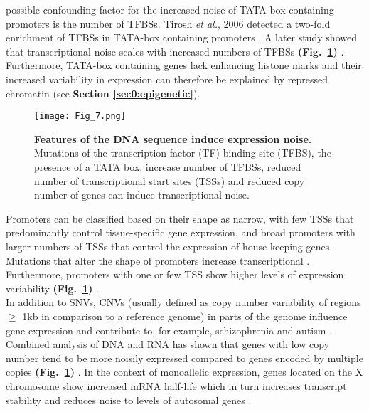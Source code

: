  possible confounding factor for the increased noise of TATA-box containing promoters is the number of TFBSs. 
Tirosh \textit{et al.}, 2006 detected a two-fold enrichment of TFBSs in TATA-box containing promoters \citep{Tirosh2006}. 
A later study showed that transcriptional noise scales with increased numbers of TFBSs \textbf{(Fig.~\ref{fig0:DNA_features})} \citep{Sharon2014}. 
Furthermore, TATA-box containing genes lack enhancing histone marks and their increased variability in expression can therefore be explained by repressed chromatin \citep{Choi2008} (see \textbf{Section \ref{sec0:epigenetic}}).  

\begin{figure}[!h]
\centering
\texttt{[image: Fig\_7.png]}
\caption[Features of the DNA sequence induce expression noise]{\textbf{Features of the DNA sequence induce expression noise.}\\
Mutations of the transcription factor (TF) binding site (TFBS), the presence of a TATA box, increase number of TFBSs, reduced number of transcriptional start sites (TSSs) and reduced copy number of genes can induce transcriptional noise.}
\label{fig0:DNA_features}
\end{figure}

Promoters can be classified based on their shape as narrow, with few \glspl{TSS} that predominantly control tissue-specific gene expression, and broad promoters with larger numbers of TSSs that control the expression of house keeping genes. 
Mutations that alter the shape of promoters increase transcriptional  \citep{Schor2017a}. 
Furthermore, promoters with one or few TSS show higher levels of expression variability \textbf{(Fig.~\ref{fig0:DNA_features})} \citep{Faure2017}.\\

In addition to \glspl{SNV}, \glspl{CNV} (usually defined as copy number variability of regions $\geq$ 1kb in comparison to a reference genome) in parts of the genome influence gene expression and contribute to, for example, schizophrenia and autism \citep{Gamazon2015}. 
Combined analysis of DNA and RNA has shown that genes with low copy number tend to be more noisily expressed compared to genes encoded by multiple copies \textbf{(Fig.~\ref{fig0:DNA_features})} \citep{Dey2015}. 
In the context of monoallelic expression, genes located on the X chromosome show increased mRNA half-life which in turn increases transcript stability and reduces noise to levels of autosomal genes \citep{Faure2017}.

